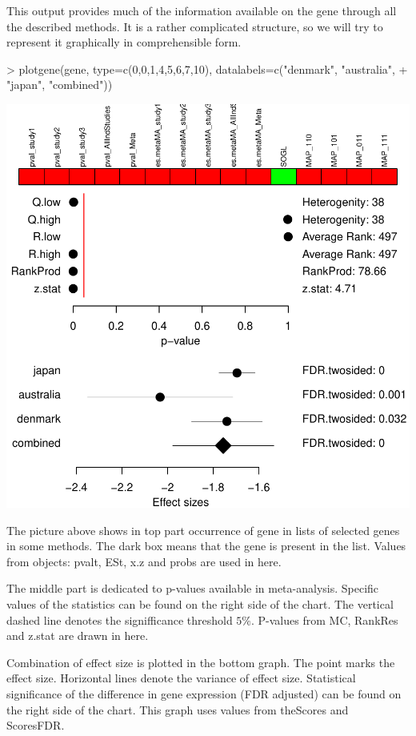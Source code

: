\documentclass[a4paper]{report}
\begin{document}
This output provides much of the information available on the gene through all the described methods. It is a rather complicated structure, so we will try to represent it graphically in comprehensible form.
\begin{center}
\begin{Schunk}
\begin{Sinput}
> plotgene(gene, type=c(0,0,1,4,5,6,7,10), datalabels=c("denmark", "australia",
+  "japan", "combined"))
\end{Sinput}
\end{Schunk}
\includegraphics{MAMA_full-076}
\end{center}
The picture above shows in top part occurrence of gene in lists of selected genes in some methods.  The dark box means that the gene is present in the list. Values from objects: {\ttfamily pvalt}, {\ttfamily ESt}, {\ttfamily x.z} and {\ttfamily probs} are used in here. \par
The middle part is dedicated to p-values available in meta-analysis. Specific values of the statistics can be found on the right side of the chart. The vertical dashed line denotes the signifficance threshold $5\%$. P-values from {\ttfamily MC}, {\ttfamily RankRes} and {\ttfamily z.stat} are drawn in here.\par
Combination of effect size is plotted in the bottom graph. The point marks the effect size. Horizontal lines denote the variance of effect size. Statistical significance of the difference in gene expression (FDR adjusted) can be found on the right side of the chart. This graph uses values from {\ttfamily theScores} and {\ttfamily ScoresFDR}.
\end{document}
